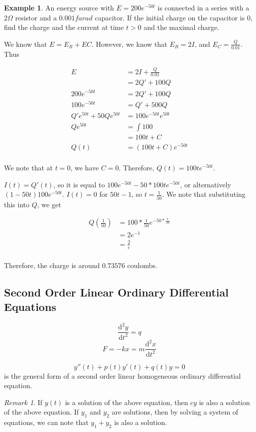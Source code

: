\documentclass[11pt]{article}
\theoremstyle{plain} %
\theoremstyle{definition}
\theoremstyle{example}
\newtheorem*{example}{Example}
\theoremstyle{remark}
\newtheorem*{remark}{Remark}
\begin{document}
\begin{example}
An energy source with $E=200e^{-50t}$ is connected in a series with a $2\Omega$ resistor and a $0.001 farad$ capacitor. If the initial charge on the capacitor is $0$, find the charge and the current at time $t>0$ and the maximal charge. 
\end{example}

We know that $E=E_R + EC$. However, we know that $E_R=2I$, and $E_C = \frac{Q}{0.01}$. Thus


\begin{align*}
E &= 2I + \frac{Q}{0.01}\\
&= 2Q' + 100Q\\
200e^{-50t} &= 2Q'+100Q\\
100e^{-50t} &= Q' + 500Q\\
Q'e^{50t} + 50Qe^{50t} &= 100e^{-50t}e^{50t}\\
Qe^{50t} &= \int 100\\
&= 100t+C\\
Q(t) &= (100t+C)e^{-50t}\\
\end{align*}

We note that at $t=0$, we have $C = 0$. Therefore, $Q(t) = 100te^{-50t}$. 

$I(t) = Q'(t)$, so it is equal to $100e^{-50t}-50*100te^{-50t}$, or alternatively $(1-50t)100e^{-50t}$.  $I(t)=0$ for $50t-1$, so $t=\frac{1}{50}$. We note that substituting this into $Q$, we get

\begin{align*}
Q\left(\frac{1}{50}\right)&= 100*\frac{1}{50}e^{-50*\frac{1}{50}}\\
&= 2e^{-1}\\
&= \frac{2}{e}\\
\end{align*}

Therefore, the charge is around $0.73576$ coulombs. 

\subsection{Second Order Linear Ordinary Differential Equations}
$$\frac{\mathrm d ^2y}{\mathrm d t^2} = q$$
$$F = -kx = m\frac{\mathrm d ^2x}{\mathrm d t^2}$$

$$y''(t) + p(t)y'(t) + q(t) y  =0$$ is the general form of a second order linear homogeneous ordinary differential equation. 

\begin{remark}
If $y(t)$ is a solution of the above equation, then $cy$ is also a solution of the above equation. If $y_1$ and $y_2$ are solutions, then by solving a system of equations, we can note that $y_1+y_2$ is also a solution. 
\end{remark}
\end{document}
